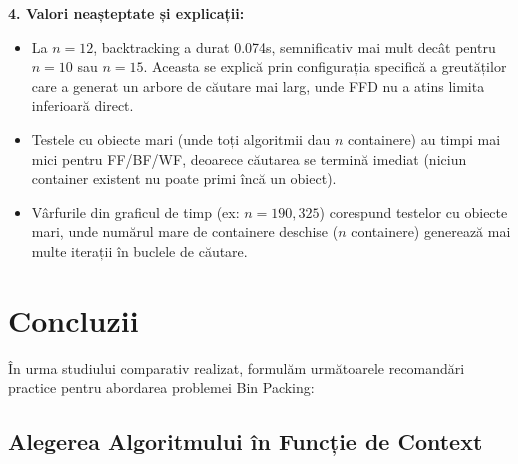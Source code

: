 \documentclass[runningheads]{llncs}
\begin{document}
\textbf{4. Valori neașteptate și explicații:}

\begin{itemize}
    \item La $n = 12$, backtracking a durat 0.074s, semnificativ mai mult decât pentru $n = 10$ sau $n = 15$. Aceasta se explică prin configurația specifică a greutăților care a generat un arbore de căutare mai larg, unde FFD nu a atins limita inferioară direct.
    \item Testele cu obiecte mari (unde toți algoritmii dau $n$ containere) au timpi mai mici pentru FF/BF/WF, deoarece căutarea se termină imediat (niciun container existent nu poate primi încă un obiect).
    \item Vârfurile din graficul de timp (ex: $n = 190, 325$) corespund testelor cu obiecte mari, unde numărul mare de containere deschise ($n$ containere) generează mai multe iterații în buclele de căutare.
\end{itemize}

\section{Concluzii}

În urma studiului comparativ realizat, formulăm următoarele recomandări practice pentru abordarea problemei Bin Packing:

\subsection{Alegerea Algoritmului în Funcție de Context}
\end{document}

